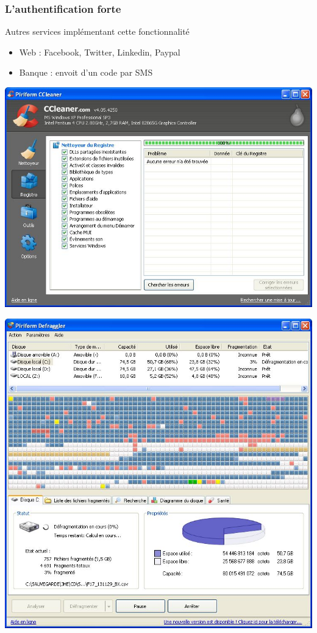 \documentclass{beamer}
\begin{document}
\begin{frame}
\frametitle{L'authentification forte}
\begin{block}{Autres services implémentant cette fonctionnalité}
\begin{itemize}
\item Web : Facebook, Twitter, Linkedin, Paypal
\item Banque : envoit d'un code par SMS
\end{itemize}
\end{block}
\end{frame}

\begin{frame}
\begin{center}
\includegraphics[scale=0.5] {./images/Annexe01.jpg} 
\end{center}
\end{frame}

\begin{frame}
\begin{center}
\includegraphics[scale=0.5] {./images/Annexe02.jpg} 
\end{center}
\end{frame}
\end{document}
